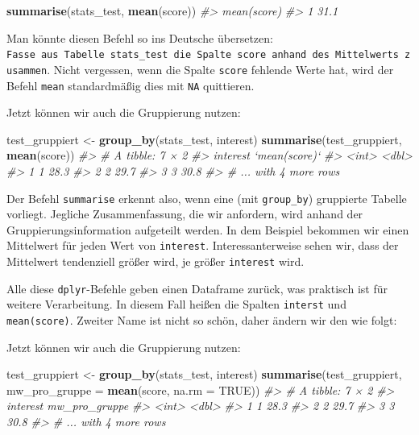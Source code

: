 \documentclass[12pt,]{book}
\makeatletter
\newenvironment{Shaded}{\begin{snugshade}}{\end{snugshade}}
\newcommand{\KeywordTok}[1]{\textcolor[rgb]{0.13,0.29,0.53}{\textbf{{#1}}}}
\newcommand{\DataTypeTok}[1]{\textcolor[rgb]{0.13,0.29,0.53}{{#1}}}
\newcommand{\StringTok}[1]{\textcolor[rgb]{0.31,0.60,0.02}{{#1}}}
\newcommand{\CommentTok}[1]{\textcolor[rgb]{0.56,0.35,0.01}{\textit{{#1}}}}
\newcommand{\OtherTok}[1]{\textcolor[rgb]{0.56,0.35,0.01}{{#1}}}
\newcommand{\NormalTok}[1]{{#1}}
\newenvironment{kframe}{%
\medskip{}
\setlength{\fboxsep}{.8em}
 \def\at@end@of@kframe{}%
 \ifinner\ifhmode%
  \def\at@end@of@kframe{\end{minipage}}%
  \begin{minipage}{\columnwidth}%
 \fi\fi%
 \def\FrameCommand##1{\hskip\@totalleftmargin \hskip-\fboxsep
 \colorbox{shadecolor}{##1}\hskip-\fboxsep
     \hskip-\linewidth \hskip-\@totalleftmargin \hskip\columnwidth}%
 \MakeFramed {\advance\hsize-\width
   \@totalleftmargin\z@ \linewidth\hsize
   \@setminipage}}%
 {\par\unskip\endMakeFramed%
 \at@end@of@kframe}
\renewenvironment{Shaded}{\begin{kframe}}{\end{kframe}}
\makeatother
\begin{document}
\begin{Shaded}
\begin{Highlighting}[]
\KeywordTok{summarise}\NormalTok{(stats_test, }\KeywordTok{mean}\NormalTok{(score))}
\CommentTok{#>   mean(score)}
\CommentTok{#> 1        31.1}
\end{Highlighting}
\end{Shaded}

Man könnte diesen Befehl so ins Deutsche übersetzen:
\texttt{Fasse\ aus\ Tabelle\ stats\_test\ die\ Spalte\ score\ anhand\ des\ Mittelwerts\ zusammen}.
Nicht vergessen, wenn die Spalte \texttt{score} fehlende Werte hat, wird
der Befehl \texttt{mean} standardmäßig dies mit \texttt{NA} quittieren.

Jetzt können wir auch die Gruppierung nutzen:

\begin{Shaded}
\begin{Highlighting}[]
\NormalTok{test_gruppiert <-}\StringTok{ }\KeywordTok{group_by}\NormalTok{(stats_test, interest)}
\KeywordTok{summarise}\NormalTok{(test_gruppiert, }\KeywordTok{mean}\NormalTok{(score))}
\CommentTok{#> # A tibble: 7 × 2}
\CommentTok{#>   interest `mean(score)`}
\CommentTok{#>      <int>         <dbl>}
\CommentTok{#> 1        1          28.3}
\CommentTok{#> 2        2          29.7}
\CommentTok{#> 3        3          30.8}
\CommentTok{#> # ... with 4 more rows}
\end{Highlighting}
\end{Shaded}

Der Befehl \texttt{summarise} erkennt also, wenn eine (mit
\texttt{group\_by}) gruppierte Tabelle vorliegt. Jegliche
Zusammenfassung, die wir anfordern, wird anhand der
Gruppierungsinformation aufgeteilt werden. In dem Beispiel bekommen wir
einen Mittelwert für jeden Wert von \texttt{interest}.
Interessanterweise sehen wir, dass der Mittelwert tendenziell größer
wird, je größer \texttt{interest} wird.

Alle diese \texttt{dplyr}-Befehle geben einen Dataframe zurück, was
praktisch ist für weitere Verarbeitung. In diesem Fall heißen die
Spalten \texttt{interst} und \texttt{mean(score)}. Zweiter Name ist
nicht so schön, daher ändern wir den wie folgt:

Jetzt können wir auch die Gruppierung nutzen:

\begin{Shaded}
\begin{Highlighting}[]
\NormalTok{test_gruppiert <-}\StringTok{ }\KeywordTok{group_by}\NormalTok{(stats_test, interest)}
\KeywordTok{summarise}\NormalTok{(test_gruppiert, }\DataTypeTok{mw_pro_gruppe =} \KeywordTok{mean}\NormalTok{(score, }\DataTypeTok{na.rm =} \OtherTok{TRUE}\NormalTok{))}
\CommentTok{#> # A tibble: 7 × 2}
\CommentTok{#>   interest mw_pro_gruppe}
\CommentTok{#>      <int>         <dbl>}
\CommentTok{#> 1        1          28.3}
\CommentTok{#> 2        2          29.7}
\CommentTok{#> 3        3          30.8}
\CommentTok{#> # ... with 4 more rows}
\end{Highlighting}
\end{Shaded}
\end{document}
